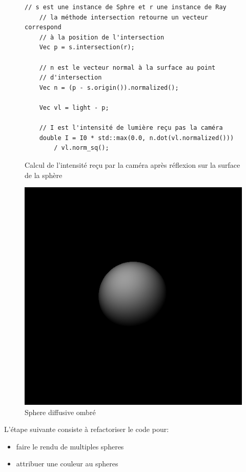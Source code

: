 \documentclass[12pt]{article}
\begin{document}
\begin{figure}
  \begin{lstlisting}[frame=single]
    // s est une instance de Sphre et r une instance de Ray
    // la méthode intersection retourne un vecteur correspond
    // à la position de l'intersection
    Vec p = s.intersection(r);

    // n est le vecteur normal à la surface au point
    // d'intersection
    Vec n = (p - s.origin()).normalized();

    Vec vl = light - p;

    // I est l'intensité de lumière reçu pas la caméra
    double I = I0 * std::max(0.0, n.dot(vl.normalized()))
        / vl.norm_sq();
  \end{lstlisting}
  \caption{Calcul de l'intensité reçu par la caméra après réflexion sur la surface de la sphère}\label{code:platre}
\end{figure}

\begin{figure}[ht]
  \centering
  \includegraphics[width=12cm]{../result/step2}
  \caption{Sphere diffusive ombré}\label{fig:step2}
\end{figure}

L'étape suivante consiste à refactoriser le code pour:
\begin{itemize}
  \item faire le rendu de multiples spheres
  \item attribuer une couleur au spheres
\end{itemize}
\end{document}

